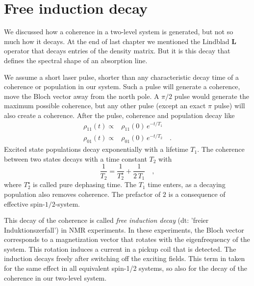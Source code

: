 \section{Free induction decay}

We discussed how a coherence in a two-level system is generated, but not so much how it decays. At the end of last chapter we mentioned the Lindblad $\boldsymbol{L}$ operator that decays entries of the density matrix. But it is this decay that defines the spectral shape of an absorption line.

We assume a short laser pulse, shorter than any characteristic decay time of a coherence or population in our system. Such a pulse will generate a coherence, move the Bloch vector away from the north pole. A $\pi/2$ pulse would generate the maximum possible coherence, but any other pulse (except an exact $\pi$ pulse) will also create a coherence. After the pulse,  coherence  and population decay like
\begin{align}
 \rho_{11}(t) \propto & \rho_{11}(0)  \, e^{- t / T_1} \\
 \rho_{01}(t) \propto & \rho_{01}(0)  \, e^{- t / T_2} \quad .
\end{align}
Excited state populations decay exponentially with a lifetime $T_1$. The coherence between two states decays with a time constant $T_2$ with
\begin{equation}
    \frac{1}{T_2} = \frac{1}{T_2^\star} + \frac{1}{2 \, T_1} \quad ,
\end{equation}
where $T_2^\star$ is called pure dephasing time. The $T_1$ time enters, as a decaying population also removes coherence. The prefactor of $2$ is a consequence of effective spin-$1/2$-system.

This decay of the coherence is called \emph{free induction decay} (dt: 'freier Induktionszerfall') in NMR experiments. In these experiments, the Bloch vector corresponds to a magnetization vector that rotates with the eigenfrequency of the system. This rotation induces a current in a pickup coil that is detected. The induction decays freely after switching off the exciting fields. This term in taken for the same effect in all equivalent spin-1/2 systems, so also for the decay of the coherence in our two-level system.

